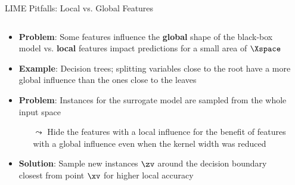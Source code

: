\documentclass[11pt,compress,t,notes=noshow, aspectratio=169, xcolor=table]{beamer}
\begin{document}
\begin{vbframe}[c]{LIME Pitfalls: Local vs. Global Features }

\begin{columns}
	\begin{column}{0.78\textwidth}
\begin{itemize}
	\item \textbf{Problem}: Some features influence the \textbf{global} shape of the black-box model vs. \textbf{local} features impact predictions for a small area of $\Xspace$ 
	\item \textbf{Example}: Decision trees; splitting variables close to the root have a more global influence than the ones close to the leaves
	\item \textbf{Problem}: Instances for the surrogate model are sampled from the whole input space 
	\begin{itemize}
	    \item[$\leadsto$] Hide the features with a local influence for the benefit of features with a global influence even when the kernel width was reduced 
	\end{itemize}
	\item \textbf{Solution}: Sample new instances $\zv$ around the decision boundary closest from point $\xv$ for higher local accuracy
\end{itemize}
\end{column}
\begin{column}{0.2\textwidth}


\end{column}
\end{columns}
\end{vbframe}
\end{document}
